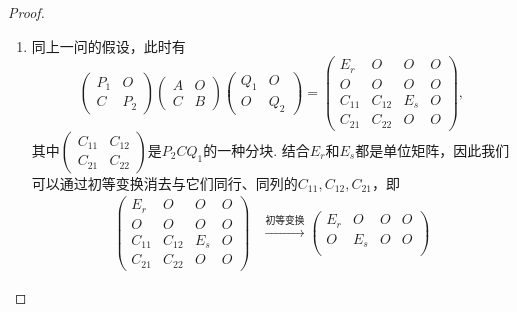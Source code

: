 \begin{enumerate}
\begin{proof}
\begin{enumerate}
                  \item 同上一问的假设，此时有
                        \[
                            \begin{pmatrix}
                                P_1 & O \\ C & P_2
                            \end{pmatrix}
                            \begin{pmatrix}
                                A & O \\ C & B
                            \end{pmatrix}
                            \begin{pmatrix}
                                Q_1 & O \\ O & Q_2
                            \end{pmatrix}
                             =\begin{pmatrix}
                                    E_r & O & O & O \\ O & O & O & O \\ C_{11} & C_{12} & E_s & O \\ C_{21} & C_{22} & O & O
                                \end{pmatrix},
                        \]
                        其中$\begin{pmatrix}
                                C_{11} & C_{12} \\ C_{21} & C_{22}
                            \end{pmatrix}$是$P_2CQ_1$的一种分块. 结合$E_r$和$E_s$都是单位矩阵，因此我们可以通过初等变换消去与它们同行、同列的$C_{11},C_{12},C_{21}$，即
                        \begin{align*}
                            \begin{pmatrix}
                                E_r    & O      & O   & O \\
                                O      & O      & O   & O \\
                                C_{11} & C_{12} & E_s & O \\
                                C_{21} & C_{22} & O   & O
                            \end{pmatrix}
                             & \xrightarrow{\text{初等变换}}\begin{pmatrix}
                                                                E_r & O      & O & O \\
                                                                O   & E_s    & O & O \\

\end{pmatrix}
\end{align*}
\end{enumerate}
\end{proof}
\end{enumerate}

